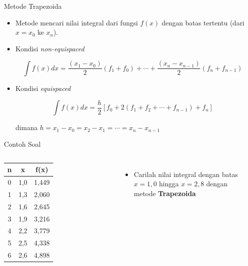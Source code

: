 \documentclass[10pt]{beamer}
\begin{document}
\begin{frame}[fragile]{Metode Trapezoida}
    \begin{itemize}[<+- | alert@+>]
        \item Metode mencari nilai integral dari fungsi $f(x)$ dengan batas tertentu (dari $x = x_0$ ke $x_n$).
        \item Kondisi \emph{non-equispaced}
        
        \begin{equation*}
            \int f(x) dx = \frac{(x_1 - x_0)}{2}(f_1 + f_0) + \cdots + \frac{(x_n - x_{n-1})}{2}(f_n + f_{n-1})
        \end{equation*}

        \item Kondisi \emph{equispaced}
        
        \begin{equation*}
            \int f(x) dx = \frac{h}{2}[f_0 + 2(f_1 + f_2 + \cdots +f_{n-1}) + f_n]
        \end{equation*}

        dimana $h = x_1 - x_0 = x_2 - x_1 = \cdots = x_n - x_{n-1}$
    \end{itemize}
\end{frame}

\begin{frame}[fragile]{Contoh Soal}
    \begin{columns}[T,onlytextwidth]
        \begin{table}
            \begin{tabular}{@{} ccc @{}}
            \toprule
            \textbf{n} &   \textbf{x} & \textbf{f(x)}\\
            \midrule
            0 &   1,0 & 1,449\\
            1 &   1,3 & 2,060\\
            2 &   1,6 & 2,645\\
            3 &   1,9 & 3,216\\
            4 &   2,2 & 3,779\\
            5 &   2,5 & 4,338\\
            6 &   2,6 & 4,898\\
            \bottomrule
            \end{tabular}
        \end{table}

        \begin{itemize}
            \item Carilah nilai integral dengan batas $x = 1,0$ hingga $x = 2,8$ dengan metode \textbf{Trapezoida}
        \end{itemize}
    \end{columns}
\end{frame}
\end{document}
